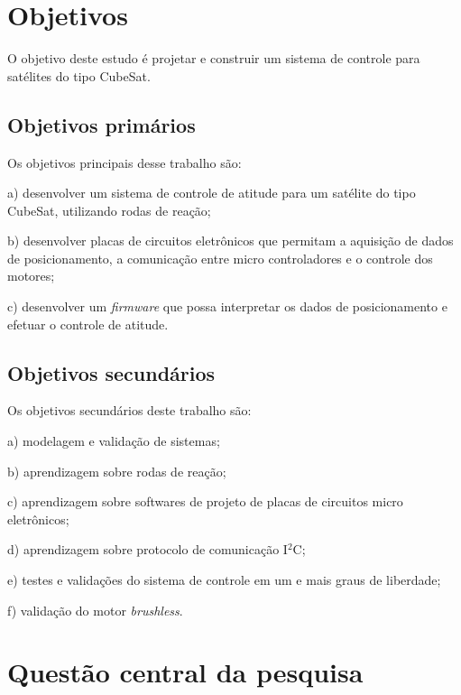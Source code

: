 \documentclass[
	12pt,				%
	openany,			%
	twoside,			%
	a4paper,			%
	english,			%
	french,				%
	spanish,			%
	brazil,				%
	oldfontcommands
	]{abntex2}
\begin{document}
\section{Objetivos}

O objetivo deste estudo é projetar e construir um sistema de controle para satélites do tipo CubeSat.

\subsection[Objetivos primários]{Objetivos primários}

Os objetivos principais desse trabalho são:

a)	desenvolver um sistema de controle de atitude para um satélite do tipo CubeSat, utilizando rodas de reação;

b)	desenvolver placas de circuitos eletrônicos que permitam a aquisição de dados de posicionamento, a comunicação entre micro controladores e o controle dos motores;

c)	desenvolver um \textit{firmware} que possa interpretar os dados de posicionamento e efetuar o controle de atitude.

\subsection[Objetivos secundários]{Objetivos secundários}

Os objetivos secundários deste trabalho são:

a)	modelagem e validação de sistemas;

b)	aprendizagem sobre rodas de reação;

c)	aprendizagem sobre softwares de projeto de placas de circuitos micro eletrônicos;

d)	aprendizagem sobre protocolo de comunicação I$^{2}$C;

e)	testes e validações do sistema de controle em um e mais graus de liberdade;

f) validação do motor \textit{brushless}.

\section{Questão central da pesquisa}
\end{document}
